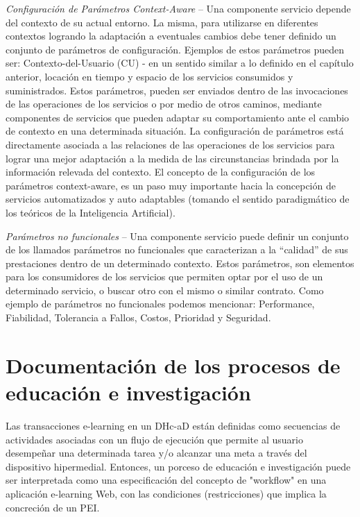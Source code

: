 \documentclass{llncs}
\begin{document}
\textit{Configuración de Parámetros Context-Aware} – Una componente servicio depende del contexto de su actual entorno. La misma, para utilizarse en diferentes contextos logrando la adaptación a eventuales cambios debe tener definido un conjunto de parámetros de configuración.  Ejemplos de estos parámetros pueden ser: Contexto-del-Usuario (CU) - en un sentido similar a lo definido en el capítulo anterior, locación en tiempo y espacio de los servicios consumidos y suministrados. Estos parámetros, pueden ser enviados dentro de las invocaciones de las operaciones de los servicios o por medio de otros caminos, mediante componentes de servicios que pueden adaptar su comportamiento ante el cambio de contexto en una determinada situación.  
La configuración de parámetros está directamente asociada a las relaciones de las operaciones de los servicios para lograr una mejor adaptación a la medida de las circunstancias brindada por la información relevada del contexto. El concepto de la configuración de los parámetros context-aware, es un paso muy importante hacia la concepción de servicios automatizados y auto adaptables (tomando el sentido paradigmático de los teóricos de la Inteligencia Artificial).

\textit{Parámetros no funcionales} – Una componente servicio puede definir un conjunto de  los llamados parámetros no funcionales que caracterizan a la “calidad” de sus prestaciones dentro de un determinado contexto. Estos parámetros, son elementos para los consumidores de los servicios que permiten optar por el uso de un determinado  servicio, o buscar otro con el mismo o similar contrato. Como ejemplo de parámetros no funcionales podemos mencionar: Performance, Fiabilidad, Tolerancia a Fallos, Costos, Prioridad y Seguridad.




\section{Documentación de los procesos de educación e investigación}


Las transacciones e-learning en un DHc-aD están definidas como secuencias de actividades asociadas con un flujo de ejecución que permite al usuario desempeñar una determinada tarea  y/o alcanzar una meta a través del dispositivo hipermedial. Entonces, un porceso de educación e investigación puede ser interpretada como una especificación del concepto de "workflow" en una aplicación e-learning Web, con las condiciones (restricciones) que implica la concreción de un PEI.
\end{document}
